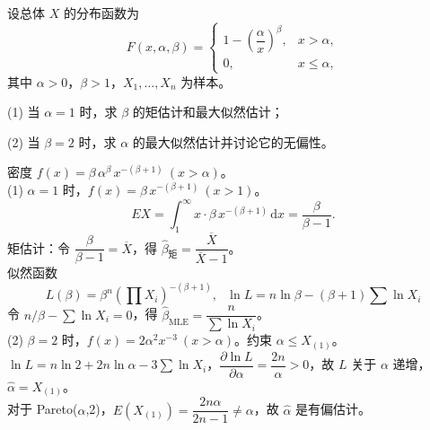 \documentclass[lang=cn,11pt]{elegantbook}
\begin{document}
\begin{exercise}\label{exer:7-pareto}
设总体 \(X\) 的分布函数为
\[
F(x,\alpha,\beta) = \begin{cases} 1-\left(\dfrac{\alpha}{x}\right)^{\!\beta}, & x > \alpha, \\ 0, & x \leq \alpha, \end{cases}
\]
其中 \(\alpha > 0\)，\(\beta > 1\)，\(X_1, \dots, X_n\) 为样本。\par
(1) 当 \(\alpha=1\) 时，求 \(\beta\) 的矩估计和最大似然估计；\par
(2) 当 \(\beta=2\) 时，求 \(\alpha\) 的最大似然估计并讨论它的无偏性。
\end{exercise}
\begin{solution}
密度 \(f(x) = \beta\,\alpha^\beta\,x^{-(\beta+1)}\ (x > \alpha)\)。\\
(1) \(\alpha=1\) 时，\(f(x) = \beta\,x^{-(\beta+1)}\ (x > 1)\)。
\[
EX = \int_1^\infty x\cdot\beta\,x^{-(\beta+1)}\,\mathrm{d}x = \frac{\beta}{\beta-1}.
\]
矩估计：令 \(\dfrac{\beta}{\beta-1} = \overline{X}\)，得 \(\hat{\beta}_{\text{矩}} = \dfrac{\overline{X}}{\overline{X}-1}\)。\\
似然函数 \[L(\beta) = \beta^n\!\left(\prod X_i\right)^{-(\beta+1)},~~~\ln L = n\ln\beta - (\beta+1)\sum\ln X_i\]
令 \(n/\beta - \sum\ln X_i = 0\)，得 \(\hat{\beta}_{\text{MLE}} = \dfrac{n}{\sum\ln X_i}\)。\\
(2) \(\beta=2\) 时，\(f(x) = 2\alpha^2 x^{-3}\ (x > \alpha)\)。约束 \(\alpha \leq X_{(1)}\)。\\
\(\ln L = n\ln 2 + 2n\ln\alpha - 3\sum\ln X_i\)，\(\dfrac{\partial\ln L}{\partial\alpha} = \dfrac{2n}{\alpha} > 0\)，故 \(L\) 关于 \(\alpha\) 递增，\(\hat{\alpha} = X_{(1)}\)。\\
对于 Pareto(\(\alpha\),2)，\(E(X_{(1)}) = \dfrac{2n\alpha}{2n-1} \neq \alpha\)，故 \(\hat{\alpha}\) 是有偏估计。
\end{solution}
\end{document}
